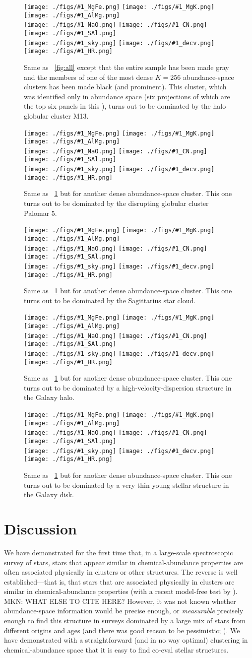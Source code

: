 \documentclass[12pt, letterpaper, preprint]{aastex}
\newcommand{\insanefigure}[1]{%
\texttt{[image: ./figs/\#1\_MgFe.png]}%
\texttt{[image: ./figs/\#1\_MgK.png]}%
\texttt{[image: ./figs/\#1\_AlMg.png]}\\
\texttt{[image: ./figs/\#1\_NaO.png]}%
\texttt{[image: ./figs/\#1\_CN.png]}%
\texttt{[image: ./figs/\#1\_SAl.png]}\\
\texttt{[image: ./figs/\#1\_sky.png]}%
\texttt{[image: ./figs/\#1\_decv.png]}%
\texttt{[image: ./figs/\#1\_HR.png]}}
\begin{document}
\begin{figure}[!p]
\insanefigure{cluster_0256_0253}
\caption{Same as \figurename~\ref{fig:all} except that the entire
  sample has been made gray and the members of one of the most dense
  $K=256$ abundance-space clusters has been made black (and prominent).
  This cluster, which was identified only in abundance space (six
  projections of which are the top six panels in this \figurename),
  turns out to be dominated by the halo globular cluster
  M13.\label{fig:M13}}
\end{figure}
\begin{figure}[!p]
\insanefigure{cluster_0256_0034}
\caption{Same as \figurename~\ref{fig:M13} but for another dense
  abundance-space cluster.
  This one turns out to be dominated by the disrupting globular
  cluster Palomar 5.\label{fig:Pal5}}
\end{figure}
\begin{figure}[!p]
\insanefigure{cluster_0256_0177}
\caption{Same as \figurename~\ref{fig:M13} but for another dense
  abundance-space cluster.
  This one turns out to be dominated by the Sagittarius star
  cloud.\label{fig:Sgr}}
\end{figure}
\begin{figure}[!p]
\insanefigure{cluster_0256_0010}
\caption{Same as \figurename~\ref{fig:M13} but for another dense
  abundance-space cluster.
  This one turns out to be dominated by a high-velocity-dispersion
  structure in the Galaxy halo.\label{fig:halo}}
\end{figure}
\begin{figure}[!p]
\insanefigure{cluster_0256_0141}
\caption{Same as \figurename~\ref{fig:M13} but for another dense
  abundance-space cluster.
  This one turns out to be dominated by a very thin young stellar
  structure in the Galaxy disk.\label{fig:disk}}
\end{figure}

\clearpage
\section{Discussion}

We have demonstrated for the first time that, in a large-scale
spectroscopic survey of stars, stars that appear similar in
chemical-abundance properties are often associated physically in
clusters or other structures.
The reverse is well established---that is, that stars that are
associated physically in clusters are similar in chemical-abundance
properties (with a recent model-free test by \citealt{bovy}).
MKN: WHAT ELSE TO CITE HERE?
However, it was not known whether abundance-space information would be
precise enough, or \emph{measurable} precisely enough to find this
structure in surveys dominated by a large mix of stars from different
origins and ages (and there was good reason to be pessimistic;
\citealt{ting}).
We have demonstrated with a straightforward (and in no way optimal)
clustering in chemical-abundance space that it is easy to find co-eval
stellar structures.
\end{document}

